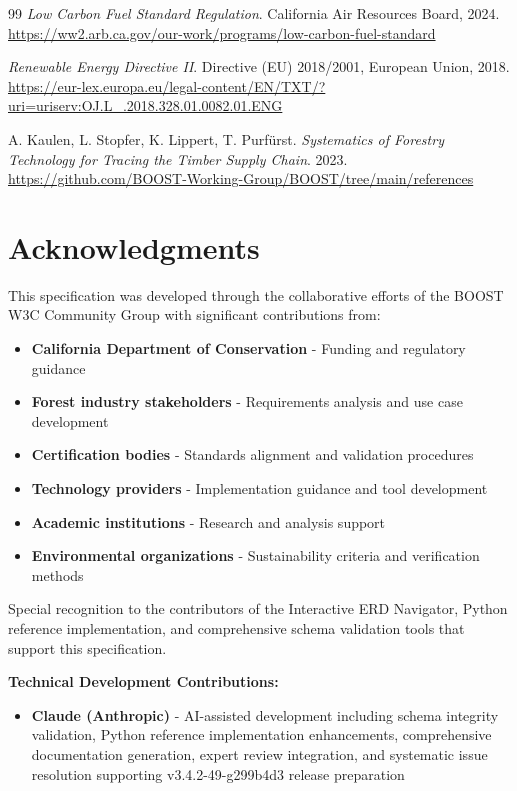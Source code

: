 \documentclass{article}
\begin{document}
\begin{thebibliography}{99}
\textit{Low Carbon Fuel Standard Regulation}. California Air Resources Board, 2024.
\url{https://ww2.arb.ca.gov/our-work/programs/low-carbon-fuel-standard}

\textit{Renewable Energy Directive II}. Directive (EU) 2018/2001, European Union, 2018.
\url{https://eur-lex.europa.eu/legal-content/EN/TXT/?uri=uriserv:OJ.L_.2018.328.01.0082.01.ENG}

A. Kaulen, L. Stopfer, K. Lippert, T. Purfürst. \textit{Systematics of Forestry Technology for Tracing the Timber Supply Chain}. 2023.
\url{https://github.com/BOOST-Working-Group/BOOST/tree/main/references}

\end{thebibliography}

\section*{Acknowledgments}

This specification was developed through the collaborative efforts of the BOOST W3C Community Group with significant contributions from:

\begin{itemize}
    \item \textbf{California Department of Conservation} - Funding and regulatory guidance
    \item \textbf{Forest industry stakeholders} - Requirements analysis and use case development  
    \item \textbf{Certification bodies} - Standards alignment and validation procedures
    \item \textbf{Technology providers} - Implementation guidance and tool development
    \item \textbf{Academic institutions} - Research and analysis support
    \item \textbf{Environmental organizations} - Sustainability criteria and verification methods
\end{itemize}

Special recognition to the contributors of the Interactive ERD Navigator, Python reference implementation, and comprehensive schema validation tools that support this specification.

\textbf{Technical Development Contributions:}
\begin{itemize}
    \item \textbf{Claude (Anthropic)} - AI-assisted development including schema integrity validation, Python reference implementation enhancements, comprehensive documentation generation, expert review integration, and systematic issue resolution supporting v3.4.2-49-g299b4d3 release preparation
\end{itemize}

\newpage
\printindex
\end{document}
